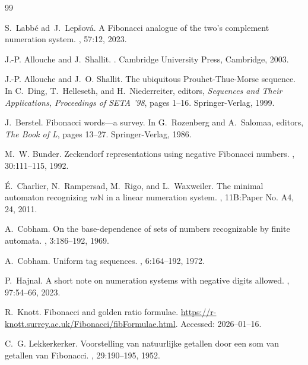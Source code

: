\documentclass[12pt,runningheads]{llncs}
\begin{document}
\begin{thebibliography}{99}

S.~{Labb\'e} ad~J.~Lep{\v{s}}ov{\'a}.
\newblock A {Fibonacci} analogue of the two's complement numeration system.
, 57:12, 2023.

J.-P. Allouche and J.~Shallit.
.
\newblock Cambridge University Press, Cambridge, 2003.

J.-P. Allouche and J.~O. Shallit.
\newblock The ubiquitous {Prouhet-Thue-Morse} sequence.
\newblock In C.~Ding, T.~Helleseth, and H.~Niederreiter, editors, {\em
  Sequences and Their Applications, Proceedings of SETA '98}, pages 1--16.
  Springer-Verlag, 1999.

J.~Berstel.
\newblock Fibonacci words---a survey.
\newblock In G.~Rozenberg and A.~Salomaa, editors, {\em The Book of L}, pages
  13--27. Springer-Verlag, 1986.

M.~W. Bunder.
\newblock Zeckendorf representations using negative {Fibonacci} numbers.
, 30:111--115, 1992.

{\'E}.~Charlier, N.~Rampersad, M.~Rigo, and L.~Waxweiler.
\newblock The minimal automaton recognizing {$m \mathbb{N}$} in a linear
  numeration system.
, 11B:Paper No. A4, 24, 2011.

A.~Cobham.
\newblock On the base-dependence of sets of numbers recognizable by finite
  automata.
, 3:186--192, 1969.

A.~Cobham.
\newblock Uniform tag sequences.
, 6:164--192, 1972.

P.~Hajnal.
\newblock A short note on numeration systems with negative digits allowed.
, 97:54--66, 2023.

R.~Knott.
\newblock Fibonacci and golden ratio formulae.
\newblock \url{https://r-knott.surrey.ac.uk/Fibonacci/fibFormulae.html}.
\newblock Accessed: 2026--01--16.

C.~G. Lekkerkerker.
\newblock Voorstelling van natuurlijke getallen door een som van getallen van
  {Fibonacci}.
, 29:190--195, 1952.


\end{thebibliography}
\end{document}
